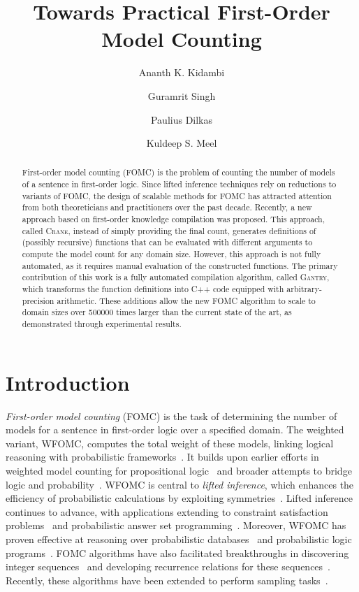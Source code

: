 \documentclass[a4paper,UKenglish,cleveref,autoref,thm-restate]{lipics-v2021}
\title{Towards Practical First-Order Model Counting}
\author{Ananth K. Kidambi}{Indian Institute of Technology Bombay, Mumbai, India}{210051002@iitb.ac.in}{}{}
\author{Guramrit Singh}{Indian Institute of Technology Bombay, Mumbai, India}{guramrit@iitb.ac.in}{}{}
\author{Paulius Dilkas}{University of Toronto, Toronto, Canada \and Vector Institute, Toronto, Canada \and \url{https://dilkas.github.io/}}{paulius.dilkas@utoronto.ca}{https://orcid.org/0000-0001-9185-7840}{}
\author{Kuldeep S. Meel}{University of Toronto, Toronto, Canada \and \url{https://www.cs.toronto.edu/~meel/}}{meel@cs.toronto.edu}{https://orcid.org/0000-0001-9423-5270}{}
\newcommand{\Cranetwo}{\textsc{Gantry}}
\begin{document}
\maketitle

\begin{abstract}
  First-order model counting (FOMC) is the problem of counting the number of
  models of a sentence in first-order logic. Since lifted inference techniques
  rely on reductions to variants of FOMC, the design of scalable methods for
  FOMC has attracted attention from both theoreticians and practitioners over
  the past decade. Recently, a new approach based on first-order knowledge
  compilation was proposed. This approach, called \textsc{Crane}, instead of
  simply providing the final count, generates definitions of (possibly
  recursive) functions that can be evaluated with different arguments to compute
  the model count for any domain size. However, this approach is not fully
  automated, as it requires manual evaluation of the constructed functions. The
  primary contribution of this work is a fully automated compilation algorithm,
  called \Cranetwo{}, which transforms the function definitions into C++ code
  equipped with arbitrary-precision arithmetic. These additions allow the new
  FOMC algorithm to scale to domain sizes over \num{500000} times larger than
  the current state of the art, as demonstrated through experimental results.
\end{abstract}

\section{Introduction}

\emph{First-order model counting} (FOMC) is the task of determining the number
of models for a sentence in first-order logic over a specified domain. The
weighted variant, WFOMC, computes the total weight of these models, linking
logical reasoning with probabilistic
frameworks~\cite{DBLP:conf/ijcai/BroeckTMDR11}. It builds upon earlier efforts
in weighted model counting for propositional
logic~\cite{DBLP:journals/ai/ChaviraD08} and broader attempts to bridge logic
and
probability~\cite{DBLP:journals/ai/Nilsson86,novak2012mathematical,vsaletic2024graded}.
WFOMC is central to \emph{lifted inference}, which enhances the efficiency of
probabilistic calculations by exploiting
symmetries~\cite{DBLP:conf/ecai/Kersting12}. Lifted inference continues to
advance, with applications extending to constraint satisfaction
problems~\cite{DBLP:journals/jair/TotisDRK23} and probabilistic answer set
programming~\cite{DBLP:journals/ijar/AzzoliniR23}. Moreover, WFOMC has proven
effective at reasoning over probabilistic
databases~\cite{DBLP:journals/debu/GribkoffSB14} and probabilistic logic
programs~\cite{DBLP:journals/ijar/RiguzziBZCL17}. FOMC algorithms have also
facilitated breakthroughs in discovering integer
sequences~\cite{DBLP:conf/ijcai/SvatosJT0K23} and developing recurrence
relations for these sequences~\cite{DBLP:conf/kr/DilkasB23}. Recently, these
algorithms have been extended to perform sampling
tasks~\cite{DBLP:journals/ai/WangPWK24}.
\end{document}
